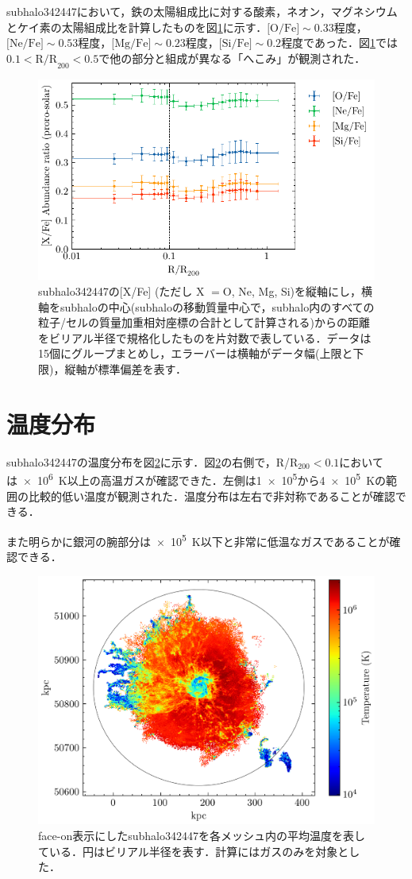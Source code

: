 \documentclass[main.tex]{subfiles}
\begin{document}
	subhalo342447において，鉄の太陽組成比に対する酸素，ネオン，マグネシウムとケイ素の太陽組成比を計算したものを図\ref{fig:fe10}に示す．$\text{[O/Fe]} \sim 0.33$程度，$\text{[Ne/Fe]} \sim 0.53$程度，$\text{[Mg/Fe]} \sim 0.23$程度，$\text{[Si/Fe]} \sim 0.2$程度であった．図\ref{fig:fe10}では$0.1<\text{R/R}_{200} < 0.5$で他の部分と組成が異なる「へこみ」が観測された．
	
	\begin{figure}[htbp]
		\centering
		\includegraphics[width=0.8\linewidth]{pic/Fe10}
		\caption{subhalo342447の[X/Fe] (ただし X $=$O, Ne, Mg, Si)を縦軸にし，横軸をsubhaloの中心(subhaloの移動質量中心で，subhalo内のすべての粒子/セルの質量加重相対座標の合計として計算される)からの距離をビリアル半径で規格化したものを片対数で表している．データは15個にグループまとめし，エラーバーは横軸がデータ幅(上限と下限)，縦軸が標準偏差を表す．}
		\label{fig:fe10}
	\end{figure}
	
	\section{温度分布}
	
	subhalo342447の温度分布を図\ref{fig:atemp}に示す．図\ref{fig:atemp}の右側で，R/R$_{200} < 0.1$においては\SI{e6}{K}以上の高温ガスが確認できた．左側は\num{1e+5}から\SI{4e+5}{K}の範囲の比較的低い温度が観測された．温度分布は左右で非対称であることが確認できる．
	
	また明らかに銀河の腕部分は\SI{e5}{K}以下と非常に低温なガスであることが確認できる．
	
	\begin{figure}[htbp]
		\centering
		\includegraphics[width=0.8\linewidth]{pic/a_temp}
		\captionsetup{width=0.9\linewidth}
		\caption{face-on表示にしたsubhalo342447を各メッシュ内の平均温度を表している．円はビリアル半径を表す．計算にはガスのみを対象とした．}
		\label{fig:atemp}
	\end{figure}
\end{document}

